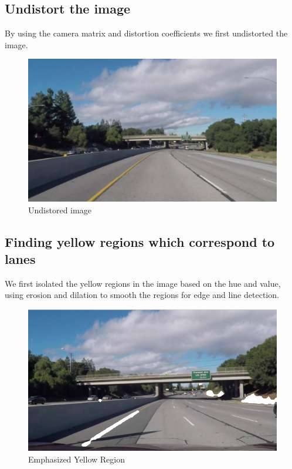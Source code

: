 \documentclass[12pt]{report}
\begin{document}
{\subsection*{Undistort the image}
By using the camera matrix and distortion coefficients we first undistorted the image.
\begin{figure}[h!]
    \centering
    \includegraphics[scale=0.2]{undistort__01.png}
    \caption{Undistored image}
    \label{fig:my_label2}
\end{figure}
\subsection*{Finding yellow regions which correspond to lanes}
We first isolated the yellow regions in the image based on the hue and value, using erosion and dilation to smooth the regions for edge and line detection.
\begin{figure}[h!]
    \centering
    \includegraphics[scale=0.4]{yellow__01.png}
    \caption{Emphasized Yellow Region}
    \label{fig:my_label2}
\end{figure}
}
\end{document}

